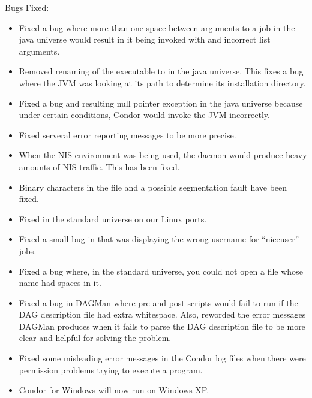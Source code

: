 \noindent Bugs Fixed:
\begin{itemize}

\item Fixed a bug where more than one space between arguments to a job
in the java universe would result in it being invoked with and incorrect
list arguments.

\item Removed renaming of the executable to  in the java
universe. This fixes a bug where the JVM was looking at its path to determine
its installation directory.

\item Fixed a bug and resulting null pointer exception in the java universe
because under certain conditions, Condor would invoke the JVM incorrectly.

\item Fixed serveral error reporting messages to be more precise.

\item When the NIS environment was being used, the  daemon
would produce heavy amounts of NIS traffic. This has been fixed.

\item Binary characters in the  file and a possible
segmentation fault have been fixed.

\item Fixed  in the standard universe on our Linux ports.

\item Fixed a small bug in  that was displaying the wrong
username for ``niceuser'' jobs.

\item Fixed a bug where, in the standard universe, you could not open a file
whose name had spaces in it.

\item Fixed a bug in DAGMan where pre and post scripts would fail to
run if the DAG description file had extra whitespace.
Also, reworded the error messages DAGMan produces when it fails to
parse the DAG description file to be more clear and helpful for
solving the problem.

\item Fixed some misleading error messages in the Condor log files
when there were permission problems trying to execute a program. 

\item Condor for Windows will now run on Windows XP.


\end{itemize}
